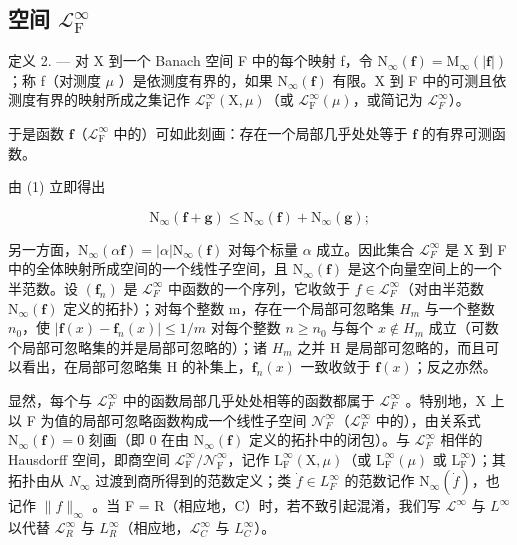\subsection{\texorpdfstring{空间 \(\mathcal{L}_{\mathrm{F}}^{\infty}\)}{空间 L sub F to infinity}}

定义 2. --- 对 X 到一个 Banach 空间 F 中的每个映射 f，令 \(\mathrm{N}_{\infty}(\mathbf{f}) = \mathrm{M}_{\infty}(|\mathbf{f}|)\)；称 f（对测度 \(\mu\) ）是依测度有界的，如果 \(\mathrm{N}_{\infty}(\mathbf{f})\) 有限。X 到 F 中的可测且依测度有界的映射所成之集记作 \(\mathcal{L}_{\mathrm{F}}^{\infty}(\mathrm{X}, \mu)\)（或 \(\mathcal{L}_{\mathrm{F}}^{\infty}(\mu)\)，或简记为 \(\mathcal{L}_{F}^{\infty}\)）。

于是函数 \(\mathbf{f}\)（\(\mathcal{L}_{\mathrm{F}}^{\infty}\) 中的）可如此刻画：存在一个局部几乎处处等于 \(\mathbf{f}\) 的有界可测函数。

由 (1) 立即得出

\[
\mathrm{N} _ {\infty} (\mathbf {f} + \mathbf {g}) \leqslant \mathrm{N} _ {\infty} (\mathbf {f}) + \mathrm{N} _ {\infty} (\mathbf {g});
\]

另一方面，\(\mathrm{N}_{\infty}(\alpha\mathbf{f}) = |\alpha| \mathrm{N}_{\infty}(\mathbf{f})\) 对每个标量 \(\alpha\) 成立。因此集合 \(\mathcal{L}_{F}^{\infty}\) 是 X 到 F 中的全体映射所成空间的一个线性子空间，且 \(\mathrm{N}_{\infty}(\mathbf{f})\) 是这个向量空间上的一个半范数。设 \((\mathbf{f}_{n})\) 是 \(\mathcal{L}_{F}^{\infty}\) 中函数的一个序列，它收敛于 \(f \in \mathcal{L}_{F}^{\infty}\)（对由半范数 \(\mathrm{N}_{\infty}(\mathbf{f})\) 定义的拓扑）；对每个整数 m，存在一个局部可忽略集 \(H_{m}\) 与一个整数 \(n_{0}\)，使 \(|\mathbf{f}(x) - \mathbf{f}_{n}(x)| \leqslant 1/m\) 对每个整数 \(n \geqslant n_{0}\) 与每个 \(x \notin H_{m}\) 成立（可数个局部可忽略集的并是局部可忽略的）；诸 \(H_{m}\) 之并 H 是局部可忽略的，而且可以看出，在局部可忽略集 H 的补集上，\(\mathbf{f}_{n}(x)\) 一致收敛于 \(\mathbf{f}(x)\)；反之亦然。

显然，每个与 \(\mathcal{L}_{F}^{\infty}\) 中的函数局部几乎处处相等的函数都属于 \(\mathcal{L}_{F}^{\infty}\) 。特别地，X 上以 F 为值的局部可忽略函数构成一个线性子空间 \(\mathcal{N}_{F}^{\infty}\)（\(\mathcal{L}_{F}^{\infty}\) 中的），由关系式 \(\mathrm{N}_{\infty}(\mathbf{f}) = 0\) 刻画（即 0 在由 \(\mathrm{N}_{\infty}(\mathbf{f})\) 定义的拓扑中的闭包）。与 \(\mathcal{L}_{F}^{\infty}\) 相伴的 Hausdorff 空间，即商空间 \(\mathcal{L}_{\mathrm{F}}^{\infty}/\mathcal{N}_{\mathrm{F}}^{\infty}\)，记作 \(\mathrm{L}_{\mathrm{F}}^{\infty}(\mathrm{X}, \mu)\)（或 \(\mathrm{L}_{\mathrm{F}}^{\infty}(\mu)\) 或 \(\mathrm{L}_{\mathrm{F}}^{\infty}\)）；其拓扑由从 \(N_{\infty}\) 过渡到商所得到的范数定义；类 \(\dot{f} \in L_{F}^{\infty}\) 的范数记作 \(\mathrm{N}_{\infty}(\dot{f})\)，也记作 \(\|f\|_{\infty}\) 。当 F = R（相应地，C）时，若不致引起混淆，我们写 \(\mathcal{L}^{\infty}\) 与 \(L^{\infty}\) 以代替 \(\mathcal{L}_{R}^{\infty}\) 与 \(L_{R}^{\infty}\)（相应地，\(\mathcal{L}_{C}^{\infty}\) 与 \(L_{C}^{\infty}\)）。

